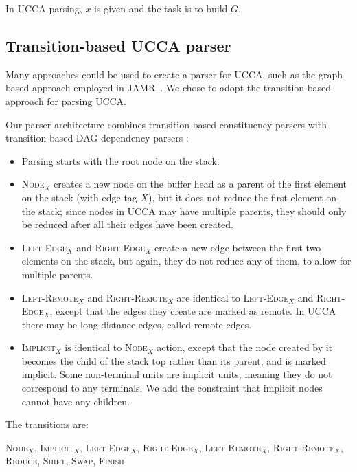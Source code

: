 \documentclass[11pt]{article}
\begin{document}
In UCCA parsing, $x$ is given and the task is to build $G$.

\subsection{Transition-based UCCA parser}

Many approaches could be used to create a parser for UCCA, such as the graph-based approach
employed in JAMR~\cite{flanigan2014discriminative}.
We chose to adopt the transition-based approach for parsing UCCA.

Our parser architecture combines transition-based constituency parsers \cite{zhu2013fast,maier2015discontinuous} with transition-based DAG dependency parsers \cite{sagae2008shift,tokgoz2015transition}:

\begin{itemize}
	\item Parsing starts with the root node on the stack.
	\item \textsc{Node$_X$} creates a new node on the buffer head as a parent of the first element on the stack (with edge tag $X$), but it does not reduce the first element on the stack; since nodes in UCCA may have multiple parents, they should only be reduced after all their edges have been created.
	\item \textsc{Left-Edge$_X$} and \textsc{Right-Edge$_X$} create a new edge between the first two elements on the stack, but again, they do not reduce any of them, to allow for multiple parents.
	\item \textsc{Left-Remote$_X$} and \textsc{Right-Remote$_X$} are identical to \textsc{Left-Edge$_X$} and \textsc{Right-Edge$_X$}, except that the edges they create are marked as remote. In UCCA there may be long-distance edges, called remote edges.
	\item \textsc{Implicit$_X$} is identical to \textsc{Node$_X$} action, except that the node created by it becomes the child of the stack top rather than its parent, and is marked implicit. Some non-terminal units are implicit units, meaning they do not correspond to any terminals. We add the constraint that implicit nodes cannot have any children.
\end{itemize}

The transitions are:

\textsc{Node$_X$, Implicit$_X$, Left-Edge$_X$, Right-Edge$_X$, Left-Remote$_X$, Right-Remote$_X$, Reduce, Shift, Swap, Finish}
\end{document}
